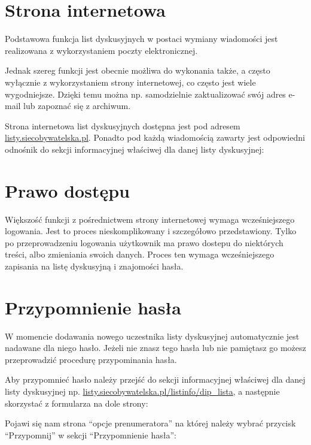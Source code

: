 \documentclass[letterpaper,10pt,polish]{sphinxmanual}
\begin{document}
\section{Strona internetowa}
\label{users:strona-internetowa}
Podstawowa funkcja list dyskusyjnych w postaci wymiany wiadomości jest realizowana z wykorzystaniem poczty elektronicznej.

Jednak szereg funkcji jest obecnie możliwa do wykonania także, a często wyłącznie z wykorzystaniem strony internetowej, co często jest wiele wygodniejsze. Dzięki temu można np. samodzielnie zaktualizować swój adres e-mail lub zapoznać się z archiwum.

Strona internetowa list dyskusyjnych dostępna jest pod adresem \href{https://listy.siecobywatelska.pl}{listy.siecobywatelska.pl}. Ponadto pod każdą wiadomością zawarty jest odpowiedni odnośnik do sekcji informacyjnej właściwej dla danej listy dyskusyjnej:

\noindent{}


\section{Prawo dostępu}
\label{users:prawo-dostepu}
Większość funkcji z pośrednictwem strony internetowej wymaga wcześniejszego logowania. Jest to proces nieskomplikowany i szczegółowo przedstawiony. Tylko po przeprowadzeniu logowania użytkownik ma prawo dostepu do niektórych treści, albo zmieniania swoich danych. Proces ten wymaga wcześniejszego zapisania na listę dyskusyjną i znajomości hasła.


\section{Przypomnienie hasła}
\label{users:przypomnienie-hasla}
W momencie dodawania nowego uczestnika listy dyskusyjnej automatycznie jest nadawane dla niego hasło. Jeżeli nie znasz tego hasła lub nie pamiętasz go możesz przeprowadzić procedurę przypominania hasła.

Aby przypomnieć hasło należy przejść do sekcji informacyjnej właściwej dla danej listy dyskusyjnej np. \href{https://listy.siecobywatelska.pl/listinfo/dip\_lista}{listy.siecobywatelska.pl/listinfo/dip\_lista}, a następnie skorzystać z formularza na dole strony:

\noindent{}

Pojawi się nam strona ``opcje prenumeratora'' na której należy wybrać przycisk ``Przypomnij'' w sekcji ``Przypomnienie hasła'':
\end{document}
